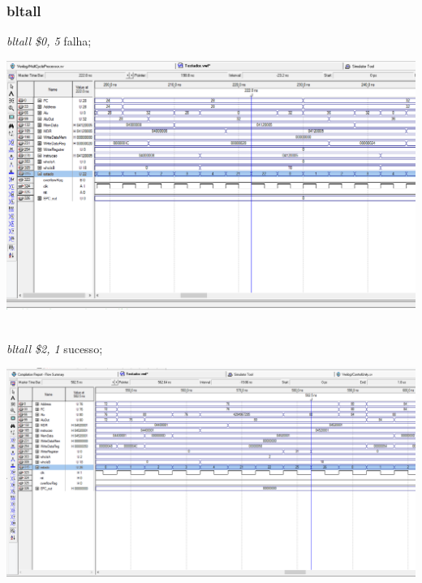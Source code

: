 \documentclass{article}
\begin{document}
    \subsubsection{bltall}
    {\it bltall \$0, 5} falha;\\
    \begin{center}
        \includegraphics[scale=0.25]{bltallfalha.PNG}
    \end{center}
    \\
    {\it bltall \$2, 1} sucesso;\\
    \begin{center}
        \includegraphics[scale=0.25]{bltallsucesso.PNG}
    \end{center}
    
    \\
\end{document}
